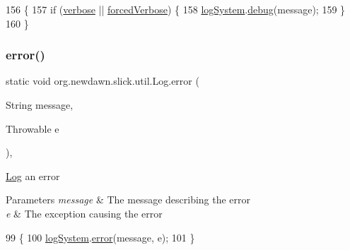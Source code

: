 \begin{DoxyCode}
156                                              \{
157         \textcolor{keywordflow}{if} (\mbox{\hyperlink{classorg_1_1newdawn_1_1slick_1_1util_1_1_log_af438e0ccf09b79bc870bd66fb9a02150}{verbose}} || \mbox{\hyperlink{classorg_1_1newdawn_1_1slick_1_1util_1_1_log_ac5c775f540d68914085b57d8ac1868f8}{forcedVerbose}}) \{
158             \mbox{\hyperlink{classorg_1_1newdawn_1_1slick_1_1util_1_1_log_acca32268a2a183e671051b4b9188cc72}{logSystem}}.\mbox{\hyperlink{interfaceorg_1_1newdawn_1_1slick_1_1util_1_1_log_system_af8c0140f915bdebab6ac9062e9fea015}{debug}}(message);
159         \}
160     \}
\end{DoxyCode}
\mbox{\label{classorg_1_1newdawn_1_1slick_1_1util_1_1_log_af7c392bb99b0afd00b28d89fffd70a11}} 
\subsubsection{\texorpdfstring{error()}{error()}\hspace{0.1cm}{\footnotesize\ttfamily [1/3]}}
{\footnotesize\ttfamily static void org.\+newdawn.\+slick.\+util.\+Log.\+error (\begin{DoxyParamCaption}\item[{String}]{message,  }\item[{Throwable}]{e }\end{DoxyParamCaption})\hspace{0.3cm}{\ttfamily [inline]}, {\ttfamily [static]}}

\mbox{\hyperlink{classorg_1_1newdawn_1_1slick_1_1util_1_1_log}{Log}} an error


\begin{DoxyParams}{Parameters}
{\em message} & The message describing the error \\
\hline
{\em e} & The exception causing the error \\
\hline
\end{DoxyParams}

\begin{DoxyCode}
99                                                           \{
100         \mbox{\hyperlink{classorg_1_1newdawn_1_1slick_1_1util_1_1_log_acca32268a2a183e671051b4b9188cc72}{logSystem}}.\mbox{\hyperlink{interfaceorg_1_1newdawn_1_1slick_1_1util_1_1_log_system_a9ba18920fcc1e6b04324a1b9dfb40640}{error}}(message, e);
101     \}
\end{DoxyCode}
\mbox{\label{classorg_1_1newdawn_1_1slick_1_1util_1_1_log_a549d8d55defc0302044e2c05d69ba486}} 
